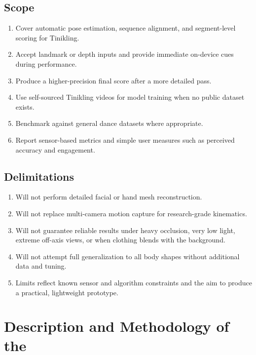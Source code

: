 \subsection{Scope}
\begin{enumerate}
\item Cover automatic pose estimation, sequence alignment, and segment-level scoring for Tinikling.
\item Accept landmark or depth inputs and provide immediate on-device cues during performance.
\item Produce a higher-precision final score after a more detailed pass.
\item Use self-sourced Tinikling videos for model training when no public dataset exists.
\item Benchmark against general dance datasets where appropriate.
\item Report sensor-based metrics and simple user measures such as perceived accuracy and engagement.
\end{enumerate}

\subsection{Delimitations}
\begin{enumerate}
\item Will not perform detailed facial or hand mesh reconstruction.
\item Will not replace multi-camera motion capture for research-grade kinematics.
\item Will not guarantee reliable results under heavy occlusion, very low light, extreme off-axis views, or when clothing blends with the background.
\item Will not attempt full generalization to all body shapes without additional data and tuning.
\item Limits reflect known sensor and algorithm constraints and the aim to produce a practical, lightweight prototype.
\end{enumerate}

\section{Description and Methodology of the \documentType}

